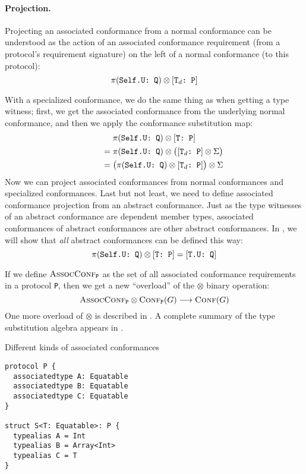 \documentclass[../generics]{subfiles}
\begin{document}
\paragraph{Projection.}
Projecting an associated conformance from a normal conformance can be understood as the action of an associated conformance requirement (from a protocol's requirement signature) on the left of a normal conformance (to this protocol):
\[\pi(\texttt{Self.U:~Q}) \otimes [\texttt{$\texttt{T}_d$:~P}]\]

With a specialized conformance, we do the same thing as when getting a type witness; first, we get the associated conformance from the underlying normal conformance, and then we apply the conformance substitution map:
\begin{gather*}
\pi(\texttt{Self.U:~Q})\otimes[\texttt{T:~P}]\\
\qquad {} = \pi(\texttt{Self.U:~Q})\otimes\bigl([\texttt{$\texttt{T}_d$:~P}]\otimes\Sigma\bigr)\\
\qquad {} = \bigl(\pi(\texttt{Self.U:~Q})\otimes[\texttt{$\texttt{T}_d$:~P}]\bigr)\otimes\Sigma
\end{gather*}
Now we can project associated conformances from normal conformances and specialized conformances. Last but not least, we need to define associated conformance projection from an abstract conformance. Just as the type witnesses of an abstract conformance are dependent member types, associated conformances of abstract conformances are other abstract conformances. In , we will show that \emph{all} abstract conformances can be defined this way:
\[
\pi(\texttt{Self.U:~Q}) \otimes [\texttt{T:~P}] = [\texttt{T.U:~Q}]
\]

If we define $\textsc{AssocConf}_{\texttt{P}}$ as the set of all associated conformance requirements in a protocol \texttt{P}, then we get a new ``overload'' of the \index{$\otimes$}$\otimes$ binary operation:
\[\textsc{AssocConf}_{\texttt{P}}\otimes\textsc{Conf}_{\texttt{P}}({G})\longrightarrow\textsc{Conf}({G})\]
One more overload of $\otimes$ is described in . A complete summary of the type substitution algebra appears in .

\begin{listing}\caption{Different kinds of associated conformances}\label{associated conformance example}
\begin{Verbatim}
protocol P {
  associatedtype A: Equatable
  associatedtype B: Equatable
  associatedtype C: Equatable
}

struct S<T: Equatable>: P {
  typealias A = Int
  typealias B = Array<Int>
  typealias C = T
}
\end{Verbatim}
\end{listing}
\end{document}
